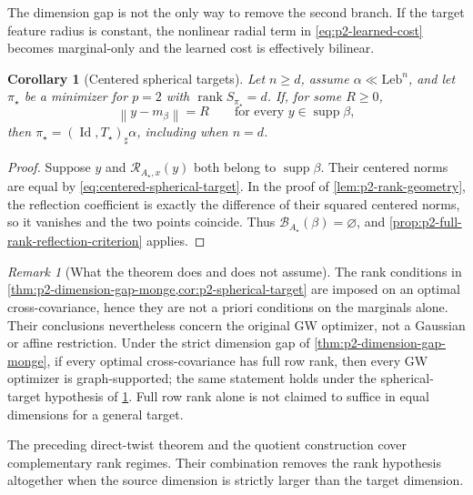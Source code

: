 \documentclass[11pt,a4paper]{article}
\newtheorem{corollary}[theorem]{Corollary}
\theoremstyle{definition}
\theoremstyle{remark}
\newtheorem{remark}[theorem]{Remark}
\newcommand{\Id}{\operatorname{Id}}
\newcommand{\supp}{\operatorname{supp}}
\newcommand{\rank}{\operatorname{rank}}
\newcommand{\norm}[1]{\left\lVert #1\right\rVert}
\begin{document}
The dimension gap is not the only way to remove the second branch.  If the
target feature radius is constant, the nonlinear radial term in
\eqref{eq:p2-learned-cost} becomes marginal-only and the learned cost is
effectively bilinear.

\begin{corollary}[Centered spherical targets]
\label{cor:p2-spherical-target}
Let \(n\geq d\), assume \(\alpha\ll\mathrm{Leb}^n\), and let
\(\pi_\star\) be a minimizer for \(p=2\) with
\(\rank S_{\pi_\star}=d\).  If, for some \(R\geq0\),
\begin{equation}
  \norm{y-m_\beta}=R
  \qquad\text{for every }y\in\supp\beta,
  \label{eq:centered-spherical-target}
\end{equation}
then \(\pi_\star=(\Id,T_\star)_\sharp\alpha\), including when \(n=d\).
\end{corollary}

\begin{proof}
Suppose \(y\) and \(\mathscr R_{A_\star,x}(y)\) both belong to
\(\supp\beta\).  Their centered norms are equal by
\eqref{eq:centered-spherical-target}.  In the proof of
\cref{lem:p2-rank-geometry}, the reflection coefficient is exactly the
difference of their squared centered norms, so it vanishes and the two points
coincide.  Thus \(\mathcal B_{A_\star}(\beta)=\varnothing\), and
\cref{prop:p2-full-rank-reflection-criterion} applies.
\end{proof}

\begin{remark}[What the theorem does and does not assume]
The rank conditions in \cref{thm:p2-dimension-gap-monge,cor:p2-spherical-target}
are imposed on an optimal cross-covariance, hence they are not a priori
conditions on the marginals alone.  Their conclusions nevertheless concern
the original GW optimizer, not a Gaussian or affine restriction.  Under the
strict dimension gap of \cref{thm:p2-dimension-gap-monge}, if every optimal
cross-covariance has full row rank, then every GW optimizer is graph-supported;
the same statement holds under the spherical-target hypothesis of
\cref{cor:p2-spherical-target}.  Full row rank alone is not claimed to suffice
in equal dimensions for a general target.
\end{remark}

The preceding direct-twist theorem and the quotient construction cover
complementary rank regimes.  Their combination removes the rank hypothesis
altogether when the source dimension is strictly larger than the target
dimension.
\end{document}

